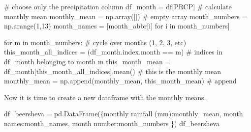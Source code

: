 \documentclass[
  letterpaper,
  DIV=11,
  numbers=noendperiod]{scrreprt}
\newenvironment{Shaded}{\begin{snugshade}}{\end{snugshade}}
\newcommand{\CommentTok}[1]{\textcolor[rgb]{0.37,0.37,0.37}{#1}}
\newcommand{\ControlFlowTok}[1]{\textcolor[rgb]{0.00,0.23,0.31}{#1}}
\newcommand{\DecValTok}[1]{\textcolor[rgb]{0.68,0.00,0.00}{#1}}
\newcommand{\KeywordTok}[1]{\textcolor[rgb]{0.00,0.23,0.31}{#1}}
\newcommand{\NormalTok}[1]{\textcolor[rgb]{0.00,0.23,0.31}{#1}}
\newcommand{\OperatorTok}[1]{\textcolor[rgb]{0.37,0.37,0.37}{#1}}
\newcommand{\StringTok}[1]{\textcolor[rgb]{0.13,0.47,0.30}{#1}}
\begin{document}
\begin{Shaded}
\begin{Highlighting}[]
\CommentTok{\# choose only the precipitation column}
\NormalTok{df\_month }\OperatorTok{=}\NormalTok{ df[}\StringTok{\textquotesingle{}PRCP\textquotesingle{}}\NormalTok{]}
\CommentTok{\# calculate monthly mean}
\NormalTok{monthly\_mean }\OperatorTok{=}\NormalTok{ np.array([])  }\CommentTok{\# empty array}
\NormalTok{month\_numbers }\OperatorTok{=}\NormalTok{ np.arange(}\DecValTok{1}\NormalTok{,}\DecValTok{13}\NormalTok{)}
\NormalTok{month\_names }\OperatorTok{=}\NormalTok{ [month\_abbr[i] }\ControlFlowTok{for}\NormalTok{ i }\KeywordTok{in}\NormalTok{ month\_numbers]}

\ControlFlowTok{for}\NormalTok{ m }\KeywordTok{in}\NormalTok{ month\_numbers:      }\CommentTok{\# cycle over months (1, 2, 3, etc)}
\NormalTok{    this\_month\_all\_indices }\OperatorTok{=}\NormalTok{ (df\_month.index.month }\OperatorTok{==}\NormalTok{ m)       }\CommentTok{\# indices in df\_month belonging to month m}
\NormalTok{    this\_month\_mean }\OperatorTok{=}\NormalTok{ df\_month[this\_month\_all\_indices].mean()  }\CommentTok{\# this is the monthly mean}
\NormalTok{    monthly\_mean }\OperatorTok{=}\NormalTok{ np.append(monthly\_mean, this\_month\_mean)    }\CommentTok{\# append}
\end{Highlighting}
\end{Shaded}

Now it is time to create a new dataframe with the monthly means.

\begin{Shaded}
\begin{Highlighting}[]
\NormalTok{df\_beersheva }\OperatorTok{=}\NormalTok{ pd.DataFrame(\{}\StringTok{\textquotesingle{}monthly rainfall (mm)\textquotesingle{}}\NormalTok{:monthly\_mean,}
                             \StringTok{\textquotesingle{}month names\textquotesingle{}}\NormalTok{:month\_names,}
                             \StringTok{\textquotesingle{}month number\textquotesingle{}}\NormalTok{:month\_numbers}
\NormalTok{                            \})}
\NormalTok{df\_beersheva}
\end{Highlighting}
\end{Shaded}
\end{document}
